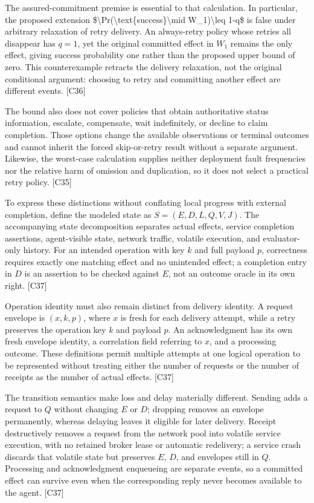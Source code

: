 \documentclass[11pt]{article}
\begin{document}
The assured-commitment premise is essential to that calculation. In particular, the proposed extension \$\textbackslash{}Pr(\textbackslash{}text\{success\}\textbackslash{}mid W\_1)\textbackslash{}leq 1-q\$ is false under arbitrary relaxation of retry delivery. An always-retry policy whose retries all disappear has $q=1$, yet the original committed effect in $W_1$ remains the only effect, giving success probability one rather than the proposed upper bound of zero. This counterexample retracts the delivery relaxation, not the original conditional argument: choosing to retry and committing another effect are different events. [C36]

The bound also does not cover policies that obtain authoritative status information, escalate, compensate, wait indefinitely, or decline to claim completion. Those options change the available observations or terminal outcomes and cannot inherit the forced skip-or-retry result without a separate argument. Likewise, the worst-case calculation supplies neither deployment fault frequencies nor the relative harm of omission and duplication, so it does not select a practical retry policy. [C35]

To express these distinctions without conflating local progress with external completion, define the modeled state as $S=(E,D,L,Q,V,J)$. The accompanying state decomposition separates actual effects, service completion assertions, agent-visible state, network traffic, volatile execution, and evaluator-only history. For an intended operation with key $k$ and full payload $p$, correctness requires exactly one matching effect and no unintended effect; a completion entry in $D$ is an assertion to be checked against $E$, not an outcome oracle in its own right. [C37]

Operation identity must also remain distinct from delivery identity. A request envelope is $(x,k,p)$, where $x$ is fresh for each delivery attempt, while a retry preserves the operation key $k$ and payload $p$. An acknowledgment has its own fresh envelope identity, a correlation field referring to $x$, and a processing outcome. These definitions permit multiple attempts at one logical operation to be represented without treating either the number of requests or the number of receipts as the number of actual effects. [C37]

The transition semantics make loss and delay materially different. Sending adds a request to $Q$ without changing $E$ or $D$; dropping removes an envelope permanently, whereas delaying leaves it eligible for later delivery. Receipt destructively removes a request from the network pool into volatile service execution, with no retained broker lease or automatic redelivery; a service crash discards that volatile state but preserves $E$, $D$, and envelopes still in $Q$. Processing and acknowledgment enqueueing are separate events, so a committed effect can survive even when the corresponding reply never becomes available to the agent. [C37]
\end{document}
